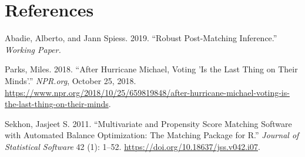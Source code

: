 \documentclass[
  12pt,
]{article}
\newlength{\cslhangindent}
\newenvironment{cslreferences}%
  {\setlength{\parindent}{0pt}%
  \everypar{\setlength{\hangindent}{\cslhangindent}}\ignorespaces}%
  {\par}
\begin{document}
\newpage

\hypertarget{references}{%
\section*{References}\label{references}}

\hypertarget{refs}{}
\begin{cslreferences}
\leavevmode\hypertarget{ref-Abadie2019}{}%
Abadie, Alberto, and Jann Spiess. 2019. ``Robust Post-Matching Inference.'' \emph{Working Paper.}

\leavevmode\hypertarget{ref-Parks2018}{}%
Parks, Miles. 2018. ``After Hurricane Michael, Voting 'Is the Last Thing on Their Minds'.'' \emph{NPR.org}, October 25, 2018. \url{https://www.npr.org/2018/10/25/659819848/after-hurricane-michael-voting-is-the-last-thing-on-their-minds}.

\leavevmode\hypertarget{ref-Sekhon2011}{}%
Sekhon, Jasjeet S. 2011. ``Multivariate and Propensity Score Matching Software with Automated Balance Optimization: The Matching Package for R.'' \emph{Journal of Statistical Software} 42 (1): 1--52. \url{https://doi.org/10.18637/jss.v042.i07}.
\end{cslreferences}
\end{document}

